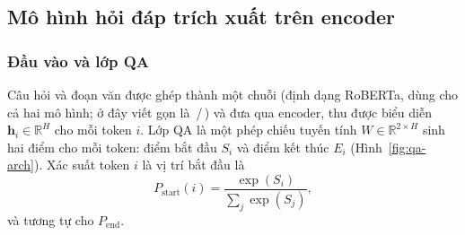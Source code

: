 \subsection{Mô hình hỏi đáp trích xuất trên encoder}
\label{sec:qahead}

\subsubsection{Đầu vào và lớp QA}

Câu hỏi và đoạn văn được ghép thành một chuỗi
 (định dạng RoBERTa, dùng cho cả hai mô hình; ở đây viết gọn là \code{[CLS]}\,/\,\code{[SEP]}) và đưa qua encoder, thu được biểu diễn
$\mathbf{h}_i \in \mathbb{R}^{H}$ cho mỗi token $i$. Lớp QA là một phép chiếu tuyến tính
$W \in \mathbb{R}^{2 \times H}$ sinh hai điểm cho mỗi token: điểm bắt đầu $S_i$ và điểm
kết thúc $E_i$ (Hình~\ref{fig:qa-arch}). Xác suất token $i$ là vị trí bắt đầu là
\begin{equation}
  P_{\text{start}}(i) = \frac{\exp(S_i)}{\sum_j \exp(S_j)},
\end{equation}
và tương tự cho $P_{\text{end}}$.

